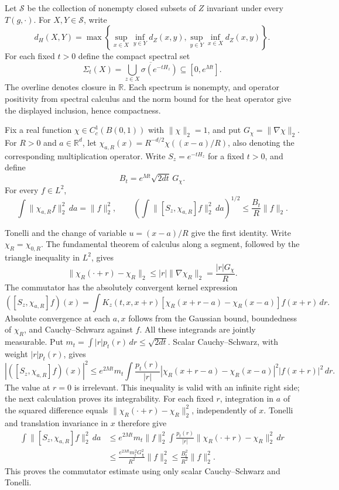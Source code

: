Let $\mathcal S$ be the collection of nonempty closed subsets of $Z$
invariant under every $T(g,\cdot)$. For $X,Y\in\mathcal S$, write
\[
d_H(X,Y)=\max\left\{
 \sup_{x\in X}\inf_{y\in Y}d_Z(x,y),
 \sup_{y\in Y}\inf_{x\in X}d_Z(x,y)\right\}.
\]
For each fixed $t>0$ define the compact spectral set
\[
\Sigma_t(X)=\overline{\bigcup_{z\in X}\sigma(e^{-tH_z})}
 \subseteq[0,e^{Mt}].
\]
The overline denotes closure in $\mathbb R$. Each spectrum is nonempty,
and operator positivity from spectral calculus and the norm bound for the heat
operator give the displayed inclusion, hence compactness.

\begin{lemma}
\label{lem:dynamic_spectral_localization}
Fix a real function $\chi\in C_c^1(B(0,1))$ with $\|\chi\|_2=1$,
and put $G_\chi=\|\nabla\chi\|_2$. For $R>0$ and $a\in\mathbb R^d$,
let $\chi_{a,R}(x)=R^{-d/2}\chi((x-a)/R)$, also denoting the
corresponding multiplication operator. Write $S_z=e^{-tH_z}$ for a
fixed $t>0$, and define
\[
B_t=e^{Mt}\sqrt{2dt}\,G_\chi.
\]
For every $f\in L^2$,
\[
\int\|\chi_{a,R}f\|_2^2\,da=\|f\|_2^2,\qquad
\left(\int\|[S_z,\chi_{a,R}]f\|_2^2\,da\right)^{1/2}
\leq \frac{B_t}{R}\|f\|_2.
\]
\end{lemma}
\Proof
Tonelli and the change of variable $u=(x-a)/R$ give the first identity.
Write $\chi_R=\chi_{0,R}$. The fundamental theorem of calculus
along a segment, followed by the triangle inequality in $L^2$, gives
\[
\|\chi_R(\cdot+r)-\chi_R\|_2
\leq |r|\|\nabla\chi_R\|_2
=\frac{|r|G_\chi}{R}.
\]
The commutator has the absolutely convergent kernel expression
\[
([S_z,\chi_{a,R}]f)(x)
=\int K_z(t,x,x+r)
 [\chi_R(x+r-a)-\chi_R(x-a)]f(x+r)\,dr.
\]
Absolute convergence at each $a,x$ follows from the Gaussian bound,
boundedness of $\chi_R$, and Cauchy--Schwarz against $f$.
All these integrands are jointly measurable. Put
$m_t=\int|r|p_t(r)\,dr\leq\sqrt{2dt}$. Scalar Cauchy--Schwarz,
with weight $|r|p_t(r)$, gives
\[
|([S_z,\chi_{a,R}]f)(x)|^2
\leq e^{2Mt}m_t\int\frac{p_t(r)}{|r|}
 |\chi_R(x+r-a)-\chi_R(x-a)|^2|f(x+r)|^2\,dr.
\]
The value at $r=0$ is irrelevant. This inequality is valid with an
infinite right side; the next calculation proves its integrability.
For each fixed $r$, integration in $a$ of the squared difference equals
$\|\chi_R(\cdot+r)-\chi_R\|_2^2$, independently of $x$.
Tonelli and translation invariance in $x$ therefore give
\[
\begin{split}
\int\|[S_z,\chi_{a,R}]f\|_2^2\,da
&\leq e^{2Mt}m_t\|f\|_2^2
  \int\frac{p_t(r)}{|r|}
  \|\chi_R(\cdot+r)-\chi_R\|_2^2\,dr\\
&\leq\frac{e^{2Mt}m_t^2G_\chi^2}{R^2}\|f\|_2^2
\leq\frac{B_t^2}{R^2}\|f\|_2^2.
\end{split}
\]
This proves the commutator estimate using only scalar
Cauchy--Schwarz and Tonelli.
\Done

